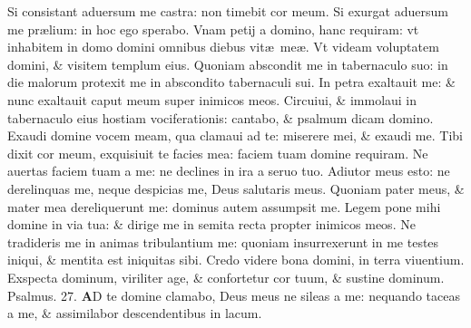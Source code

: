 \documentclass[a5paper,10pt]{book}
\def\ae{æ}
\begin{document}
\begin{multicols*}{2}
\newline \color{red} S\color{black}i consistant aduersum me castra: non timebit cor meum.
\newline \color{red} S\color{black}i exurgat aduersum me pr\ae lium: in hoc ego sperabo.
\newline \color{red} V\color{black}nam petij a domino, hanc requiram: vt inhabitem in domo domini omnibus diebus vit\ae \ me\ae .
\newline \color{red} V\color{black}t videam voluptatem domini, \& visitem templum eius.
\newline \color{red} Q\color{black}uoniam abscondit me in tabernaculo suo: in die malorum protexit me in abscondito tabernaculi sui.
\newline \color{red} I\color{black}n petra exaltauit me: \& nunc exaltauit caput meum super inimicos meos.
\newline \color{red} C\color{black}ircuiui, \& immolaui in tabernaculo eius hostiam vociferationis: cantabo, \& psalmum dicam domino.
\newline \color{red} E\color{black}xaudi domine vocem meam, qua clamaui ad te: miserere mei, \& exaudi me.
\newline \color{red} T\color{black}ibi dixit cor meum, exquisiuit te facies mea: faciem tuam domine requiram.
\newline \color{red} N\color{black}e auertas faciem tuam a me: ne declines in ira a seruo tuo.
\newline \color{red} A\color{black}diutor meus esto: ne derelinquas me, neque despicias me, Deus salutaris meus.
\newline \color{red} Q\color{black}uoniam pater meus, \& mater mea dereliquerunt me: dominus autem assumpsit me.
\newline \color{red} L\color{black}egem pone mihi domine in via tua: \& dirige me in semita recta propter inimicos meos.%
\newline \color{red} N\color{black}e tradideris me in animas tribulantium me: quoniam insurrexerunt in me testes iniqui, \& mentita est iniquitas sibi.
\newline \color{red} C\color{black}redo videre bona domini, in terra viuentium.
\newline \color{red} E\color{black}xspecta dominum, viriliter age, \& confortetur cor tuum, \& sustine dominum. \quad \color{red} Psalmus. 27. \color{black}
\vspace{-1em}
\lettrine[lines=2]{\bfseries \color{red} A}{}D te domine clamabo, Deus meus ne sileas a me: nequando taceas a me, \& assimilabor descendentibus in lacum.

\end{multicols*}
\end{document}

